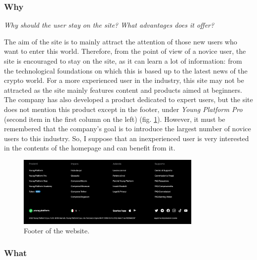 \subsubsection{Why}

\centerline{\textit{Why should the user stay on the site? What advantages 
does it offer?}}
The aim of the site is to mainly attract the attention of those new users 
who want to enter this world. Therefore, from the point of view of a novice 
user, the site is encouraged to stay on the site, as it can learn a lot of 
information: from the technological foundations on which this is based up 
to the latest news of the crypto world. For a more experienced user in the 
industry, this site may not be attracted as the site mainly features content 
and products aimed at beginners. The company has also developed a product 
dedicated to expert users, but the site does not mention this product 
except in the footer, under \textit{Young Platform Pro} (second item in 
the first column on the left) (fig. \ref{fig:footer}). However, it must be 
remembered that the company's goal is to introduce the largest number of 
novice users to this industry. So, I suppose that an inexperienced user is 
very interested in the contents of the homepage and can benefit from it.

\begin{figure}[H]
	\centering
	\includegraphics[width=0.80\textwidth]{res/images/footer.png}
	\caption{Footer of the website.}
	\label{fig:footer}
\end{figure}

\subsubsection{What}

